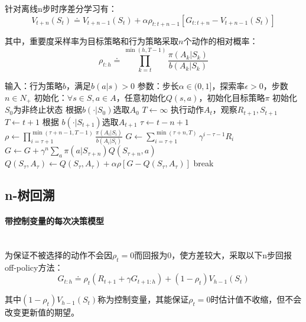 \documentclass[
12pt, %
a4paper, 
oneside, %
headinclude,footinclude, %
]{scrartcl}
\begin{document}
针对离线n步时序差分学习有：
$$ V_{t + n}(S_t) \doteq V_{t + n - 1}(S_t) + \alpha \rho_{t:t + n - 1}[G_{t:t + n} - V_{t + n - 1}(S_t)] $$

其中，重要度采样率为目标策略和行为策略采取$ n $个动作的相对概率：
$$ \rho_{t:h} \doteq \prod_{k = t}^{\min(h, T - 1)} \frac{\pi(A_k|S_k)}{b(A_k|S_k)} $$
\begin{myalgorithm}
\State 输入：行为策略$ b $，满足$ b(a|s) > 0 $
\State 参数：步长$ \alpha \in (0,1] $，探索率$ \epsilon > 0 $，步数$ n \in N_+ $
\State 初始化：$ \forall s \in S, a \in A $，任意初始化$ Q(s, a) $，初始化目标策略$ \pi $
\State 初始化$ S_0 $为非终止状态
\State 根据$ b(\cdot|S_0) $选取$ A_0 $
\State $ T \gets \infty $
\State 执行动作$ A_t $，观察$ R_{t + 1},S_{t + 1} $
\State $ T \gets t + 1 $
\Else
\State 根据 $ b(\cdot|S_{t + 1}) $选取$A_{t + 1} $
\EndIf
\EndIf
\State $ \tau \gets t - n + 1 $ 
\State $ \rho \gets \prod_{i = \tau + 1}^{\min(\tau + n - 1,T - 1)} \frac{\pi(A_i|S_i)}{b(A_i|S_i)}$ 
\State $ G \gets \sum_{i = \tau + 1}^{\min(\tau + n,T)} \gamma^{i - \tau - 1}R_i $
\State $ G \gets G + \gamma^n \sum_a\pi(a|S_{\tau + n})Q(S_{\tau + n}, a)$ 
\EndIf
\State $ Q(S_{\tau}, A_{\tau}) \gets Q(S_{\tau}, A_{\tau}) + \alpha \rho[G - Q(S_{\tau}, A_{\tau})] $
\EndIf
{}
\State break
\EndIf
\EndFor
\EndFor
\end{myalgorithm}
\subsection{n-树回溯}
\paragraph{带控制变量的每次决策模型}~\\

为保证不被选择的动作不会因$ \rho_t = 0 $而回报为$ 0 $，使方差较大，采取以下n步回报off-policy方法：
$$ G_{t:h} \doteq \rho_t (R_{t + 1} + \gamma G_{t + 1:h}) + (1 - \rho_t) V_{h - 1}(S_t) $$

其中$ (1 - \rho_t) V_{h - 1}(S_t) $称为控制变量，其能保证$ \rho_t = 0 $时估计值不收缩，但不会改变更新值的期望。
\end{document}
